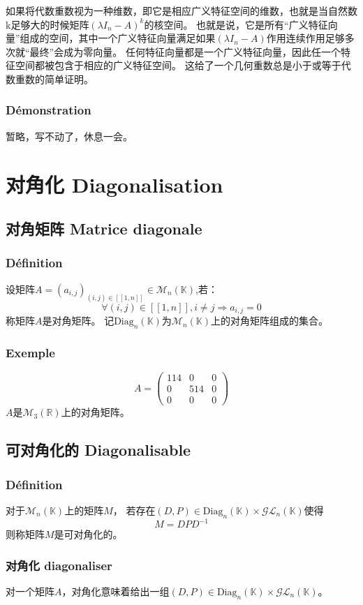 \documentclass[12pt, a4paper, oneside]{ctexbook}
\begin{document}
  如果将代数重数视为一种维数，即它是相应广义特征空间的维数，也就是当自然数k足够大的时候矩阵$(\lambda I_n-A)^k$的核空间。
  也就是说，它是所有“广义特征向量”组成的空间，其中一个广义特征向量满足如果$(\lambda I_n-A)$作用连续作用足够多次就“最终”会成为零向量。
  任何特征向量都是一个广义特征向量，因此任一个特征空间都被包含于相应的广义特征空间。
  这给了一个几何重数总是小于或等于代数重数的简单证明。
  \subsubsection{Démonstration}
  暂略，写不动了，休息一会。
\section{对角化 Diagonalisation}
  \subsection{对角矩阵 Matrice diagonale}
  \subsubsection{Définition}
  设矩阵$A=(a_{i,j})_{(i,j)\in[\![1,n]\!]}\in\mathcal{M}_n(\mathbb{K})$,若：
  $$
    \forall(i,j)\in[\![1,n]\!], i\neq j\Rightarrow a_{i,j}=0
  $$
  称矩阵$A$是对角矩阵。
  记$\mbox{Diag}_n(\mathbb{K})$为$\mathcal{M}_n(\mathbb{K})$上的对角矩阵组成的集合。
  \subsubsection{Exemple}
  $$
  A=\begin{pmatrix} 114 & 0 & 0 \\ 0 & 514 & 0 \\ 0 & 0 & 0 \end{pmatrix}
  $$
  $A$是$\mathcal{M}_3(\mathbb{R})$上的对角矩阵。
  \subsection{可对角化的 Diagonalisable}
  \subsubsection{Définition}
  对于$\mathcal{M}_n(\mathbb{K})$上的矩阵$M$，
  若存在$(D,P)\in\mbox{Diag}_n(\mathbb{K})\times\mathcal{G} \mathcal{L} _n(\mathbb{K})$使得
  $$
  M=DPD^{-1}
  $$
  则称矩阵$M$是可对角化的。
  \subsubsection{对角化 diagonaliser}
  对一个矩阵$A$，对角化意味着给出一组$(D,P)\in\mbox{Diag}_n(\mathbb{K})\times\mathcal{G} \mathcal{L} _n(\mathbb{K})$。\\
\end{document}
